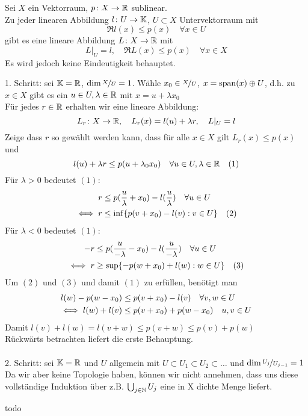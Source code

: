 \begin{satz}  \label{satz:20.2-HahnBanach}
		Sei $X$ ein Vektorraum, $p \colon X \rightarrow \mathbb{R}$ sublinear. \\
		Zu jeder linearen Abbildung $l \colon U \rightarrow \mathbb{K}$, $U \subset X$ Untervektorraum mit
			\[ \Re l(x) \leq p(x) \quad \forall x \in U \]
		gibt es eine lineare Abbildung $L \colon X \rightarrow \mathbb{R}$ mit 
			\[ L|_{U} = l, \quad \Re  L(x) \leq p(x) \quad \forall x \in X \]
		Es wird jedoch keine Eindeutigkeit behauptet.
\end{satz}

\begin{beweis}
	1. Schritt: sei $\mathbb{K} = \mathbb{R}$, $\dim \nicefrac{X}{U} = 1$. Wähle $x_{0} \in \nicefrac{X}{U}$, $x = \operatorname{span}(x) \oplus U$, d.h. zu $x \in X$ gibt es ein $u \in U, \lambda \in \mathbb{R}$ mit $x = u + \lambda x_{0}$ \\
	Für jedes $r \in \mathbb{R}$ erhalten wir eine lineare Abbildung:
	\[ L_{r} \colon X \rightarrow \mathbb{R}, \quad L_{r} (x) = l(u) + \lambda r, \quad L|_{U} = l \]
	Zeige dass $r$ so gewählt werden kann, dass für alle $x \in X$ gilt $L_{r}(x) \leq p(x)$ und 
	\[ l(u) + \lambda r \leq p(u + \lambda_{0} x_{0}) \quad \forall u \in U, \lambda \in \mathbb{R} \quad (1) \label{eq:20.2.5-1} \]
	Für $\lambda > 0$ bedeutet \hyperref[eq:20.2.5-1]{$(1)$}:
	\begin{align*}
		r & \leq p(\frac{u}{\lambda} + x_{0}) - l(\frac{u}{\lambda}) \quad \forall u \in U \\
		\iff r & \leq \inf \{ p( v + x_{0}) - l(v) : v \in U \} \quad (2) \label{eq:20.2.5-2}
	\end{align*}
	Für $\lambda < 0$ bedeutet \hyperref[eq:20.2.5-1]{$(1)$}:
	\begin{align*}
		- r & \leq p(\frac{u}{- \lambda} - x_{0}) - l(\frac{u}{- \lambda}) \quad \forall u \in U \\
		\iff r & \geq \sup \{ - p( w + x_{0}) + l(w) : w \in U \} \quad (3) \label{eq:20.2.5-3}
	\end{align*}
	Um \hyperref[eq:20.2.5-2]{$(2)$} und \hyperref[eq:20.2.5-3]{$(3)$} und damit \hyperref[eq:20.2.5-1]{$(1)$} zu erfüllen, benötigt man
	\begin{align*}
		l(w) - p(w - x_{0}) & \leq p(v + x_{0}) - l(v) \quad \forall v, w \in U \\
		\iff l(w) + l(v) & \leq p(v + x_{0}) + p(w - x_{0}) \quad u, v \in U
	\end{align*}
	Damit $l(v) + l(w) = l(v + w) \leq p(v + w) \leq p(v) + p(w)$ \\
	Rückwärts betrachten liefert die erste Behauptung. \\ \\
	2. Schritt: sei $\mathbb{K} = \mathbb{R}$ und $U$ allgemein mit $U \subset U_{1} \subset U_{2} \subset \dotsc$ und $\dim \nicefrac{U_{j}}{U_{j - 1}} = 1$ \\
	Da wir aber keine Topologie haben, können wir nicht annehmen, dass uns diese vollständige Induktion über z.B. $\bigcup_{j \in \mathbb{N}} U_{j}$ eine in X dichte Menge liefert.
	
	todo %
\end{beweis}

